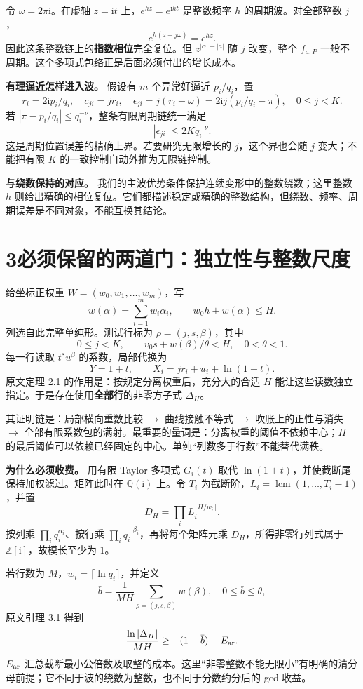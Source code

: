 \documentclass[11pt,a4paper]{article}
\newcommand{\ii}{\mathrm i}
\begin{document}
令 $\omega=2\pi\ii$。在虚轴 $z=\ii t$ 上，$e^{hz}=e^{\ii ht}$ 是整数频率 $h$ 的周期波。对全部整数 $j$，
\[
 e^{h(z+j\omega)}=e^{hz}.
\]
因此这条整数链上的\textbf{指数相位}完全复位。但 $z^{|\alpha|-|a|}$ 随 $j$ 改变，整个 $f_{a,P}$ 一般不周期。这个多项式包络正是后面必须付出的增长成本。

\textbf{有理逼近怎样进入波。} 假设有 $m$ 个异常好逼近 $p_i/q_i$，置
\[
 r_i=2\ii p_i/q_i,\quad c_{ji}=jr_i,\quad
 \epsilon_{ji}=j(r_i-\omega)=2\ii j(p_i/q_i-\pi),\quad 0\le j<K.
\]
若 $|\pi-p_i/q_i|\le q_i^{-\nu}$，整条有限周期链统一满足
\[
 |\epsilon_{ji}|\le2Kq_i^{-\nu}.
\]
这是周期位置误差的精确上界。若要研究无限增长的 $j$，这个界也会随 $j$ 变大；不能把有限 $K$ 的一致控制自动外推为无限链控制。

\textbf{与绕数保持的对应。} 我们的主波优势条件保护连续变形中的整数绕数；这里整数 $h$ 则给出精确的相位复位。它们都描述稳定或精确的整数结构，但绕数、频率、周期误差是不同对象，不能互换其结论。

\newpage
\section*{3\quad 必须保留的两道门：独立性与整数尺度}
给坐标正权重 $W=(w_0,w_1,\ldots,w_m)$，写
\[
 w(\alpha)=\sum_{i=1}^m w_i\alpha_i,
 \qquad w_0h+w(\alpha)\le H.
\]
列选自此完整单纯形。测试行标为 $\rho=(j,s,\beta)$，其中
\[
 0\le j<K,\qquad v_0s+w(\beta)/\theta<H,\quad 0<\theta<1.
\]
每一行读取 $t^su^\beta$ 的系数，局部代换为
\[
 Y=1+t,\qquad X_i=jr_i+u_i+\ln(1+t).
\]
原文定理 2.1 的作用是：按规定分离权重后，充分大的合适 $H$ 能让这些读数独立指定。于是存在使用\textbf{全部行}的非零方子式 $\Delta_H$。

其证明链是：局部横向重数比较 $\to$ 曲线接触不等式 $\to$ 吹胀上的正性与消失 $\to$ 全部有限系数包的满射。最重要的量词是：分离权重的阈值不依赖中心；$H$ 的最后阈值可以依赖已经固定的中心。单纯“列数多于行数”不能替代满秩。

\textbf{为什么必须收费。} 用有限 Taylor 多项式 $G_i(t)$ 取代 $\ln(1+t)$，并使截断尾保持加权滤过。矩阵此时在 $\mathbb Q(\ii)$ 上。令 $T_i$ 为截断阶，$L_i=\operatorname{lcm}(1,\ldots,T_i-1)$，并置
\[
 D_H=\prod_i L_i^{\lfloor H/w_i\rfloor}.
\]
按列乘 $\prod_iq_i^{\alpha_i}$、按行乘 $\prod_iq_i^{-\beta_i}$，再将每个矩阵元乘 $D_H$，所得非零行列式属于 $\mathbb Z[\ii]$，故模长至少为 $1$。

若行数为 $M$，$w_i=\lceil\ln q_i\rceil$，并定义
\[
 \bar b=\frac{1}{MH}\sum_{\rho=(j,s,\beta)}w(\beta),\quad 0\le\bar b\le\theta,
\]
原文引理 3.1 得到
\[
 \frac{\ln|\Delta_H|}{MH}\ge-(1-\bar b)-E_{\rm ar}.
\]
$E_{\rm ar}$ 汇总截断最小公倍数及取整的成本。这里“非零整数不能无限小”有明确的清分母前提；它不同于波的绕数为整数，也不同于分数约分后的 gcd 收益。
\end{document}
